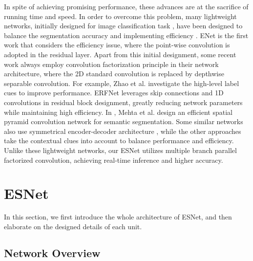 \documentclass[runningheads]{llncs}
\begin{document}
In spite of achieving promising performance, these advances are at the sacrifice of running time and speed. In order to overcome this problem, many lightweight networks, initially designed for image classification task \cite{Howard2017mobile,Rastegari2016xnor,zhang2018shuffle,Wu2016quantized,xie2017agg}, have been designed to balance the segmentation accuracy and implementing efficiency \cite{wu2018cgnet,Treml2016speeding,Paszke2016enet,Mehta2018espnet,yu2018bisenet,Zhao2018ICnet}. ENet \cite{Paszke2016enet} is the first work that considers the efficiency issue, where the point-wise convolution is adopted in the residual layer. Apart from this initial designment, some recent work always employ convolution factorization principle \cite{szegedy2015going,Howard2017mobile,Szegedy2016rethinking} in their network architecture, where the 2D standard convolution is replaced by depthwise separable convolution. For example, Zhao et al. \cite{Zhao2018ICnet} investigate the high-level label cues to improve performance. ERFNet \cite{Romera2018erfnet} leverages skip connections and 1D convolutions in residual block designment, greatly reducing network parameters while maintaining high efficiency. In \cite{Mehta2018espnet}, Mehta et al. design an efficient spatial pyramid convolution network for semantic segmentation. Some similar networks also use symmetrical encoder-decoder architecture \cite{Badrinarayanan2015Segnet,Mehta2018espnet,Romera2018erfnet,fast2019zhang}, while the other approaches take the contextual clues into account \cite{wu2018cgnet,yu2018bisenet} to balance performance and efficiency. Unlike these lightweight networks, our ESNet utilizes multiple branch parallel factorized convolution, achieving real-time inference and higher accuracy.

\section{ESNet}\label{sec:ESNet}

In this section, we first introduce the whole architecture of ESNet, and then elaborate on the designed details of each unit.

\subsection{Network Overview}\label{sec:Network}
\end{document}
